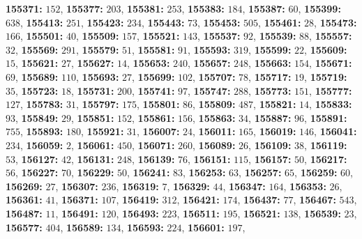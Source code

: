 \textsf{\bfseries 155371:} $152$, \textsf{\bfseries 155377:} $203$, \textsf{\bfseries 155381:} $253$, \textsf{\bfseries 155383:} $184$, \textsf{\bfseries 155387:} $60$, \textsf{\bfseries 155399:} $638$, \textsf{\bfseries 155413:} $251$, \textsf{\bfseries 155423:} $234$, \textsf{\bfseries 155443:} $73$, \textsf{\bfseries 155453:} $505$, \textsf{\bfseries 155461:} $28$, \textsf{\bfseries 155473:} $166$, \textsf{\bfseries 155501:} $40$, \textsf{\bfseries 155509:} $157$, \textsf{\bfseries 155521:} $143$, \textsf{\bfseries 155537:} $92$, \textsf{\bfseries 155539:} $88$, \textsf{\bfseries 155557:} $32$, \textsf{\bfseries 155569:} $291$, \textsf{\bfseries 155579:} $51$, \textsf{\bfseries 155581:} $91$, \textsf{\bfseries 155593:} $319$, \textsf{\bfseries 155599:} $22$, \textsf{\bfseries 155609:} $15$, \textsf{\bfseries 155621:} $27$, \textsf{\bfseries 155627:} $14$, \textsf{\bfseries 155653:} $240$, \textsf{\bfseries 155657:} $248$, \textsf{\bfseries 155663:} $154$, \textsf{\bfseries 155671:} $69$, \textsf{\bfseries 155689:} $110$, \textsf{\bfseries 155693:} $27$, \textsf{\bfseries 155699:} $102$, \textsf{\bfseries 155707:} $78$, \textsf{\bfseries 155717:} $19$, \textsf{\bfseries 155719:} $35$, \textsf{\bfseries 155723:} $18$, \textsf{\bfseries 155731:} $200$, \textsf{\bfseries 155741:} $97$, \textsf{\bfseries 155747:} $288$, \textsf{\bfseries 155773:} $151$, \textsf{\bfseries 155777:} $127$, \textsf{\bfseries 155783:} $31$, \textsf{\bfseries 155797:} $175$, \textsf{\bfseries 155801:} $86$, \textsf{\bfseries 155809:} $487$, \textsf{\bfseries 155821:} $14$, \textsf{\bfseries 155833:} $93$, \textsf{\bfseries 155849:} $29$, \textsf{\bfseries 155851:} $152$, \textsf{\bfseries 155861:} $156$, \textsf{\bfseries 155863:} $34$, \textsf{\bfseries 155887:} $96$, \textsf{\bfseries 155891:} $755$, \textsf{\bfseries 155893:} $180$, \textsf{\bfseries 155921:} $31$, \textsf{\bfseries 156007:} $24$, \textsf{\bfseries 156011:} $165$, \textsf{\bfseries 156019:} $146$, \textsf{\bfseries 156041:} $234$, \textsf{\bfseries 156059:} $2$, \textsf{\bfseries 156061:} $450$, \textsf{\bfseries 156071:} $260$, \textsf{\bfseries 156089:} $26$, \textsf{\bfseries 156109:} $38$, \textsf{\bfseries 156119:} $53$, \textsf{\bfseries 156127:} $42$, \textsf{\bfseries 156131:} $248$, \textsf{\bfseries 156139:} $76$, \textsf{\bfseries 156151:} $115$, \textsf{\bfseries 156157:} $50$, \textsf{\bfseries 156217:} $56$, \textsf{\bfseries 156227:} $70$, \textsf{\bfseries 156229:} $50$, \textsf{\bfseries 156241:} $83$, \textsf{\bfseries 156253:} $63$, \textsf{\bfseries 156257:} $65$, \textsf{\bfseries 156259:} $60$, \textsf{\bfseries 156269:} $27$, \textsf{\bfseries 156307:} $236$, \textsf{\bfseries 156319:} $7$, \textsf{\bfseries 156329:} $44$, \textsf{\bfseries 156347:} $164$, \textsf{\bfseries 156353:} $26$, \textsf{\bfseries 156361:} $41$, \textsf{\bfseries 156371:} $107$, \textsf{\bfseries 156419:} $312$, \textsf{\bfseries 156421:} $174$, \textsf{\bfseries 156437:} $77$, \textsf{\bfseries 156467:} $543$, \textsf{\bfseries 156487:} $11$, \textsf{\bfseries 156491:} $120$, \textsf{\bfseries 156493:} $223$, \textsf{\bfseries 156511:} $195$, \textsf{\bfseries 156521:} $138$, \textsf{\bfseries 156539:} $23$, \textsf{\bfseries 156577:} $404$, \textsf{\bfseries 156589:} $134$, \textsf{\bfseries 156593:} $224$, \textsf{\bfseries 156601:} $197$, 
